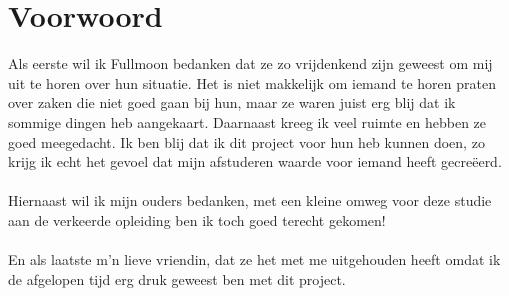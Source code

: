 \chapter*{Voorwoord} 

Als eerste wil ik Fullmoon bedanken dat ze zo vrijdenkend zijn geweest om mij uit te horen over hun situatie. Het is niet makkelijk om iemand te horen praten over zaken die niet goed gaan bij hun, maar ze waren juist erg blij dat ik sommige dingen heb aangekaart. Daarnaast kreeg ik veel ruimte en hebben ze goed meegedacht. Ik ben blij dat ik dit project voor hun heb kunnen doen, zo krijg ik echt het gevoel dat mijn afstuderen waarde voor iemand heeft gecre\"{e}erd.
\\\\
Hiernaast wil ik mijn ouders bedanken, met een kleine omweg voor deze studie aan de verkeerde opleiding ben ik toch goed terecht gekomen!
\\\\
En als laatste m'n lieve vriendin, dat ze het met me uitgehouden heeft omdat ik de afgelopen tijd erg druk geweest ben met dit project.